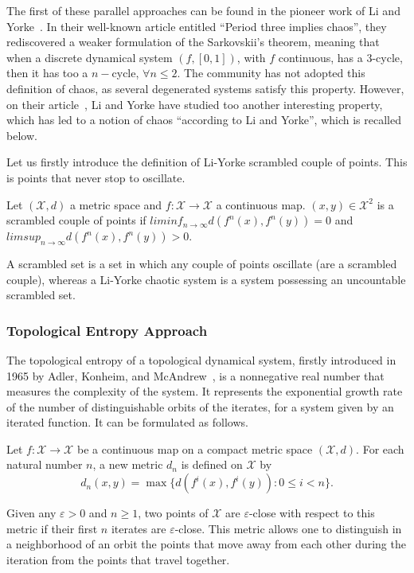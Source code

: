 The first of these parallel approaches can be found in the pioneer
work of Li and Yorke~\cite{liyorke1975}. In their well-known article entitled
``Period three implies chaos'', they rediscovered a weaker formulation of 
the Sarkovskii's theorem, meaning that when a discrete dynamical system 
$(f,[0,1])$, with $f$ continuous, has a 3-cycle, then it has too a 
$n-$cycle, $\forall n \leqslant 2$. The community has not adopted this
definition of chaos, as several degenerated systems satisfy this property.
However, on their article~\cite{liyorke1975}, Li and Yorke have studied too 
another interesting property, which has led to a notion of chaos 
``according to Li and Yorke'', which is recalled below.

Let us firstly introduce the definition of Li-Yorke scrambled couple
of points. This is points that never stop to oscillate.

\begin{definition}
Let $(\mathcal{X},d)$ a metric space and $f:\mathcal{X} \longrightarrow
\mathcal{X}$ a continuous map. $(x,y)\in \mathcal{X}^2$ is a scrambled 
couple of points if $lim inf_{n\rightarrow \infty} d(f^n(x),f^n(y))=0$
and  $lim sup_{n\rightarrow \infty} d(f^n(x),f^n(y))>0$.
\end{definition}


A scrambled set is a set in which any couple of points oscillate (are
a scrambled couple), whereas a Li-Yorke chaotic system is a system 
possessing an uncountable scrambled set.


\subsubsection{Topological Entropy Approach}


The topological entropy of a topological dynamical system,
firstly introduced in 1965 by Adler, Konheim, and McAndrew~\cite{Adler65}, 
is a nonnegative real number that measures the complexity of the system. 
It represents the exponential growth rate of the number of distinguishable 
orbits of the iterates, for a system given by an iterated function.
It can be formulated as follows.

Let $f:\mathcal{X} \longrightarrow \mathcal{X}$ be a continuous map on
a compact metric space $(\mathcal{X},d)$. For each natural 
number $n$, a new metric $d_n$ is defined on $\mathcal{X}$ by 
$$d_n(x,y)=\max\{d(f^i(x),f^i(y)): 0\leq i<n\}.$$

Given any $\varepsilon >0$ and $n \geqslant 1$, two points of 
$\mathcal{X}$ are $\varepsilon$-close with respect to 
this metric if their first $n$ iterates are $\varepsilon$-close. This 
metric allows one to distinguish in a neighborhood of an orbit the 
points that move  away from each other during the iteration from the 
points that travel together. 

